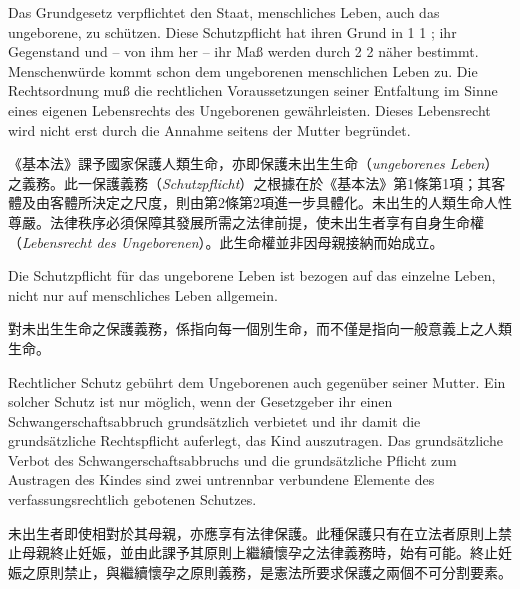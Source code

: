\documentclass[12pt]{article}
\begin{document}
\syncleft
\begin{sourcepara}[title={原文要旨 1}]
Das Grundgesetz verpflichtet den Staat, menschliches Leben, auch das ungeborene, zu schützen. Diese Schutzpflicht hat ihren Grund in \abbrArt{} 1 \abbrAbs{} 1 \abbrGG{}\ggfnArtOneOneDE{}; ihr Gegenstand und -- von ihm her -- ihr Maß werden durch \abbrArt{} 2 \abbrAbs{} 2 \abbrGG{}\ggfnArtTwoTwoDE{} näher bestimmt. Menschenwürde kommt schon dem ungeborenen menschlichen Leben zu. Die Rechtsordnung muß die rechtlichen Voraussetzungen seiner Entfaltung im Sinne eines eigenen Lebensrechts des Ungeborenen gewährleisten. Dieses Lebensrecht wird nicht erst durch die Annahme seitens der Mutter begründet.
\end{sourcepara}
\begin{transpara}
《基本法》課予國家保護人類生命，亦即保護未出生生命（\textit{ungeborenes Leben}）之義務。此一保護義務（\textit{Schutzpflicht}）之根據在於《基本法》第1條第1項\ggfnArtOneOneZH{}；其客體及由客體所決定之尺度，則由第2條第2項進一步具體化。未出生的人類生命人性尊嚴。法律秩序必須保障其發展所需之法律前提，使未出生者享有自身生命權（\textit{Lebensrecht des Ungeborenen}）。此生命權並非因母親接納而始成立。
\end{transpara}

\syncleft
\begin{sourcepara}[title={原文要旨 2}]
Die Schutzpflicht für das ungeborene Leben ist bezogen auf das einzelne Leben, nicht nur auf menschliches Leben allgemein.
\end{sourcepara}
\begin{transpara}
對未出生生命之保護義務，係指向每一個別生命，而不僅是指向一般意義上之人類生命。
\end{transpara}

\syncleft
\begin{sourcepara}[title={原文要旨 3}]
Rechtlicher Schutz gebührt dem Ungeborenen auch gegenüber seiner Mutter. Ein solcher Schutz ist nur möglich, wenn der Gesetzgeber ihr einen Schwangerschaftsabbruch grundsätzlich verbietet und ihr damit die grundsätzliche Rechtspflicht auferlegt, das Kind auszutragen. Das grundsätzliche Verbot des Schwangerschaftsabbruchs und die grundsätzliche Pflicht zum Austragen des Kindes sind zwei untrennbar verbundene Elemente des verfassungsrechtlich gebotenen Schutzes.
\end{sourcepara}
\begin{transpara}
未出生者即使相對於其母親，亦應享有法律保護。此種保護只有在立法者原則上禁止母親終止妊娠，並由此課予其原則上繼續懷孕之法律義務時，始有可能。終止妊娠之原則禁止，與繼續懷孕之原則義務，是憲法所要求保護之兩個不可分割要素。
\end{transpara}
\end{document}
